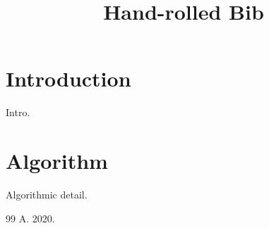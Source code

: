 \documentclass[article]{jss}
\title{Hand-rolled Bib}
\begin{document}
\section{Introduction}
Intro.
\section{Algorithm}
Algorithmic detail.
\begin{thebibliography}{99}
 A. 2020.
\end{thebibliography}
\end{document}
